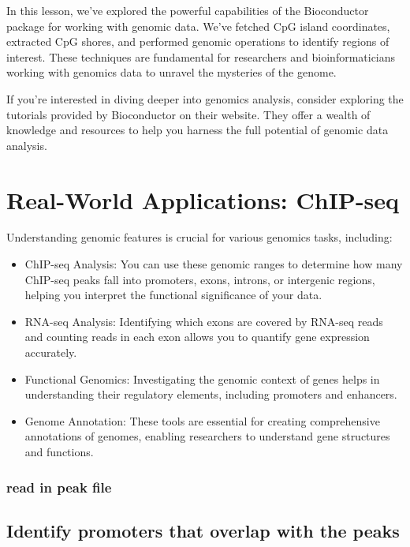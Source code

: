 \documentclass[
]{book}
\begin{document}
In this lesson, we've explored the powerful capabilities of the Bioconductor package for working with genomic data. We've fetched CpG island coordinates, extracted CpG shores, and performed genomic operations to identify regions of interest. These techniques are fundamental for researchers and bioinformaticians working with genomics data to unravel the mysteries of the genome.

If you're interested in diving deeper into genomics analysis, consider exploring the tutorials provided by Bioconductor on their website. They offer a wealth of knowledge and resources to help you harness the full potential of genomic data analysis.

\hypertarget{real-world-applications-chip-seq}{%
\section{Real-World Applications: ChIP-seq}\label{real-world-applications-chip-seq}}

Understanding genomic features is crucial for various genomics tasks, including:

\begin{itemize}
\item
  ChIP-seq Analysis: You can use these genomic ranges to determine how many ChIP-seq peaks fall into promoters, exons, introns, or intergenic regions, helping you interpret the functional significance of your data.
\item
  RNA-seq Analysis: Identifying which exons are covered by RNA-seq reads and counting reads in each exon allows you to quantify gene expression accurately.
\item
  Functional Genomics: Investigating the genomic context of genes helps in understanding their regulatory elements, including promoters and enhancers.
\item
  Genome Annotation: These tools are essential for creating comprehensive annotations of genomes, enabling researchers to understand gene structures and functions.
\end{itemize}

\hypertarget{read-in-peak-file}{%
\subsubsection{read in peak file}\label{read-in-peak-file}}

\hypertarget{identify-promoters-that-overlap-with-the-peaks}{%
\subsection{Identify promoters that overlap with the peaks}\label{identify-promoters-that-overlap-with-the-peaks}}
\end{document}
